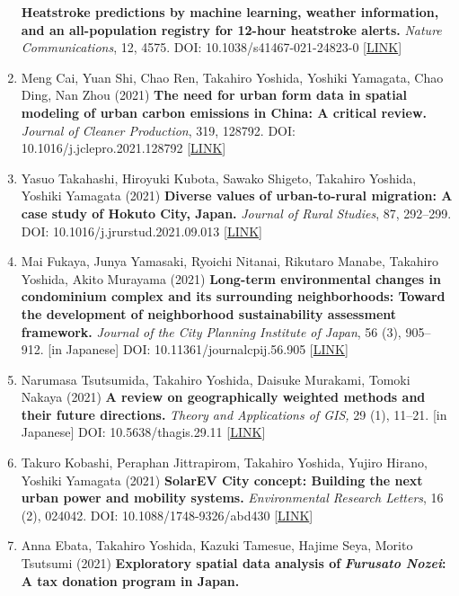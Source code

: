 \documentclass[
]{book}
\begin{document}
\begin{enumerate}
  \textbf{Heatstroke predictions by machine learning, weather information, and an all-population registry for 12-hour heatstroke alerts.}
  \emph{Nature Communications}, 12, 4575.
  DOI: 10.1038/s41467-021-24823-0 {[}\href{https://www.nature.com/articles/s41467-021-24823-0}{LINK}{]}
\item
  Meng Cai, Yuan Shi, Chao Ren, Takahiro Yoshida, Yoshiki Yamagata, Chao Ding, Nan Zhou (2021)
  \textbf{The need for urban form data in spatial modeling of urban carbon emissions in China: A critical review.}
  \emph{Journal of Cleaner Production}, 319, 128792.
  DOI: 10.1016/j.jclepro.2021.128792 {[}\href{https://doi.org/10.1016/j.jclepro.2021.128792}{LINK}{]}
\item
  Yasuo Takahashi, Hiroyuki Kubota, Sawako Shigeto, Takahiro Yoshida, Yoshiki Yamagata (2021)
  \textbf{Diverse values of urban-to-rural migration: A case study of Hokuto City, Japan.}
  \emph{Journal of Rural Studies}, 87, 292--299.
  DOI: 10.1016/j.jrurstud.2021.09.013 {[}\href{https://www.sciencedirect.com/science/article/abs/pii/S0743016721002771}{LINK}{]}
\item
  Mai Fukaya, Junya Yamasaki, Ryoichi Nitanai, Rikutaro Manabe, Takahiro Yoshida, Akito Murayama (2021)
  \textbf{Long-term environmental changes in condominium complex and its surrounding neighborhoods: Toward the development of neighborhood sustainability assessment framework.}
  \emph{Journal of the City Planning Institute of Japan}, 56 (3), 905--912. {[}in Japanese{]}
  DOI: 10.11361/journalcpij.56.905 {[}\href{https://www.jstage.jst.go.jp/article/journalcpij/56/3/56_905/_article/-char/en}{LINK}{]}
\item
  Narumasa Tsutsumida, Takahiro Yoshida, Daisuke Murakami, Tomoki Nakaya (2021)
  \textbf{A review on geographically weighted methods and their future directions.}
  \emph{Theory and Applications of GIS,} 29 (1), 11--21. {[}in Japanese{]}
  DOI: 10.5638/thagis.29.11 {[}\href{https://www.jstage.jst.go.jp/article/thagis/29/1/29_11/_article/-char/en}{LINK}{]}
\item
  Takuro Kobashi, Peraphan Jittrapirom, Takahiro Yoshida, Yujiro Hirano, Yoshiki Yamagata (2021)
  \textbf{SolarEV City concept: Building the next urban power and mobility systems.}
  \emph{Environmental Research Letters}, 16 (2), 024042.
  DOI: 10.1088/1748-9326/abd430 {[}\href{https://doi.org/10.1088/1748-9326/abd430}{LINK}{]}
\item
  Anna Ebata, Takahiro Yoshida, Kazuki Tamesue, Hajime Seya, Morito Tsutsumi (2021)
  \textbf{Exploratory spatial data analysis of} \textbf{\emph{Furusato Nozei}: A tax donation program in Japan.}

\end{enumerate}
\end{document}
